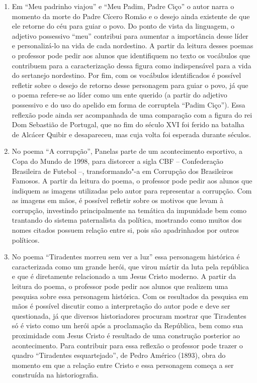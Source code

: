 \begin{enumerate}
\item Em ``Meu padrinho viajou'' e
``Meu Padim, Padre Ciço'' o autor
narra o momento da morte do Padre Cícero Romão e o desejo ainda
existente de que ele retorne do céu para guiar o povo. Do ponto de
vista da linguagem, o adjetivo possessivo
``meu'' contribui para aumentar a
importância desse líder e personalizá-lo na vida de cada nordestino. A
partir da leitura desses poemas o professor pode pedir aos alunos que
identifiquem no texto os vocábulos que contribuem para a caracterização
dessa figura como indispensável para a vida do sertanejo nordestino.
Por fim, com os vocábulos identificados é possível refletir sobre o
desejo de retorno desse personagem para guiar o povo, já que o poema
refere-se ao líder como um ente querido (a partir do adjetivo
possessivo e do uso do apelido em forma de corruptela
``Padim Ciço''). Essa reflexão pode
ainda ser acompanhada de uma comparação com a figura do rei Dom
Sebastião de Portugal, que no fim do século XVI foi ferido na batalha
de Alcácer Quibir e desapareceu, mas cuja volta
foi esperada durante séculos.

\item No poema ``A corrupção'', Panelas
parte de um acontecimento esportivo, a Copa do Mundo de 1998, para
distorcer a sigla CBF -- Confederação Brasileira de
Futebol --, transformando"-a em Corrupção dos Brasileiros Famosos. 
A partir da leitura do
poema, o professor pode pedir aos alunos que indiquem as imagens
utilizadas pelo autor para representar a corrupção. Com as imagens em
mãos, é possível refletir sobre os motivos que levam à corrupção,
investindo principalmente na temática da impunidade bem como trantando do sistema
paternalista da política, mostrando como muitos dos nomes citados
possuem relação entre si, pois são apadrinhados por outros políticos.

\item No poema ``Tiradentes morreu sem ver a
luz'' essa personagem histórica é caracterizada como
um grande herói, que virou mártir da luta pela república e que é
diretamente relacionado a um Jesus Cristo moderno. A partir da leitura
do poema, o professor pode pedir aos alunos que realizem uma pesquisa
sobre essa personagem histórica. Com os resultados da pesquisa em mãos
é possível discutir como a interpretação do autor pode e deve ser
questionada, já que diversos historiadores procuram mostrar que
Tiradentes só é visto como um herói após a proclamação da República,
bem como sua proximidade com Jesus Cristo é resultado de uma construção
posterior ao acontecimento. Para contribuir para essa reflexão o
professor pode trazer o quadro ``Tiradentes
esquartejado'', de Pedro Américo (1893), obra do
momento em que a relação entre Cristo e essa personagem começa a ser
construída na historiografia. 


\end{enumerate}
